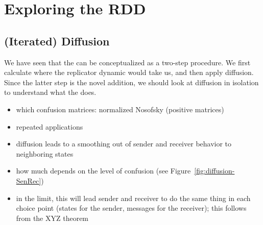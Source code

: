 \section{Exploring the RDD}

\subsection{(Iterated) Diffusion}

We have seen that the \rdd can be conceptualized as a two-step
procedure. We first calculate where the replicator dynamic would take
us, and then apply diffusion. Since the latter step is the novel
addition, we should look at diffusion in isolation to understand what
the \rdd does.

\begin{itemize}
  \item which confusion matrices: normalized Nosofsky (positive matrices)
  \item repeated applications
  \item diffusion leads to a smoothing out of sender and receiver
    behavior to neighboring states
  \item how much depends on the level of confusion (see Figure~\ref{fig:diffusion-SenRec})
  \item in the limit, this will lead sender and receiver to do the
    same thing in each choice point (states for the sender, messages
    for the receiver); this follows from the XYZ theorem
\end{itemize}


